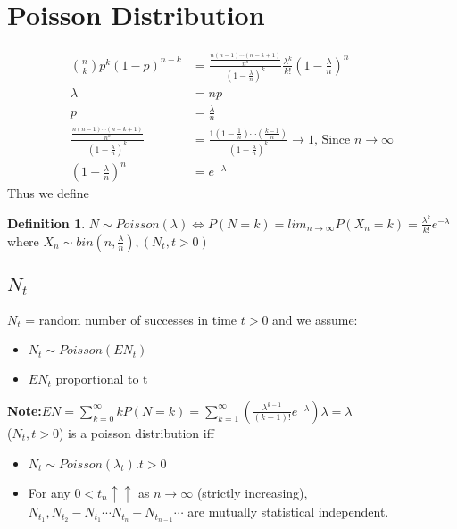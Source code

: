 \documentclass{article}
\theoremstyle{definition}
\newtheorem{definition}{Definition}[section]
\theoremstyle{thrm}
\theoremstyle{lma}
\theoremstyle{ppst}
\theoremstyle{crlr}
\begin{document}
\section{Poisson Distribution}
\begin{align*}
	{n \choose k}p^k(1-p)^{n-k}&=\frac{\frac{n(n-1)\cdots(n-k+1)}{n^k}}{(1-\frac{\lambda}{n})^k}\frac{\lambda^k}{k!}(1-\frac{\lambda}{n})^n\\
	\lambda &=np\\
	p &= \frac{\lambda}{n}\\
	\frac{\frac{n(n-1)\cdots(n-k+1)}{n^k}}{(1-\frac{\lambda}{n})^k}&=\frac{1(1-\frac{1}{n})\cdots(\frac{k-1}{n})}{(1-\frac{\lambda}{n})^k}\to 1 \text{, Since } n\to \infty\\
	(1-\frac{\lambda}{n})^n &= e^{-\lambda}
\end{align*}
Thus we define
\begin{definition}
	$N\sim Poisson(\lambda) \iff P(N=k) = lim_{n\to \infty}P(X_n=k) = \frac{\lambda^k}{k!}e^{-\lambda}$ where $X_n \sim bin(n,\frac{\lambda}{n}), (N_t, t>0)$
\end{definition}

\subsection{$N_t$}
$N_t$ = random number of successes in time $t>0$ and we assume:
\begin{itemize}
	\item $N_t\sim Poisson(EN_t)$
	\item $EN_t$ proportional to t
\end{itemize}
\textbf{Note:}$EN = \sum_{k=0}^\infty kP(N=k) = \sum_{k=1}^\infty (\frac{\lambda^{k-1}}{(k-1)!}e^{-\lambda})\lambda = \lambda$ \\
($N_t, t>0$) is a poisson distribution iff
\begin{itemize}
	\item $N_t \sim Poisson(\lambda_t). t>0$
	\item For any $0<t_n \uparrow\uparrow$ as $n\to \infty$ (strictly increasing), $N_{t_1}, N_{t_2}-N_{t_1}\cdots N_{t_n}-N_{t_{n-1}}\cdots$ are mutually statistical independent. 
\end{itemize}
\end{document}
